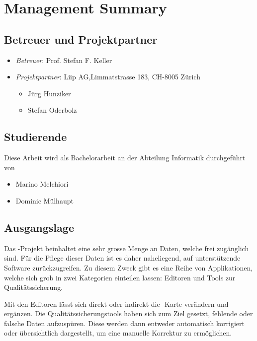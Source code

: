 \chapter*{Management Summary}
\thispagestyle{scrheadings}

\section*{Betreuer und Projektpartner}
\begin{itemize}
	\item \textit{Betreuer}: Prof. Stefan F. Keller
	\item \textit{Projektpartner}: Liip AG,Limmatstrasse 183, CH-8005 Zürich
	\begin{itemize}
		\item Jürg Hunziker
		\item Stefan Oderbolz
	\end{itemize}
\end{itemize}

\section*{Studierende}
Diese Arbeit wird als Bachelorarbeit an der Abteilung Informatik durchgeführt von
\begin{itemize}
	\item Marino Melchiori
	\item Dominic Mülhaupt
\end{itemize}

\section*{Ausgangslage}
Das -Projekt beinhaltet eine sehr grosse Menge an Daten, welche frei zugänglich sind.
Für die Pflege dieser Daten ist es daher naheliegend, auf unterstützende Software zurückzugreifen.
Zu diesem Zweck gibt es eine Reihe von Applikationen, welche sich grob in zwei Kategorien einteilen lassen:
Editoren und Tools zur Qualitätssicherung.

Mit den Editoren lässt sich direkt oder indirekt die -Karte verändern und ergänzen.
Die Qualitätssicherungstools haben sich zum Ziel gesetzt, fehlende oder falsche Daten aufzuspüren.
Diese werden dann entweder automatisch korrigiert oder übersichtlich dargestellt, um eine manuelle Korrektur zu ermöglichen.

